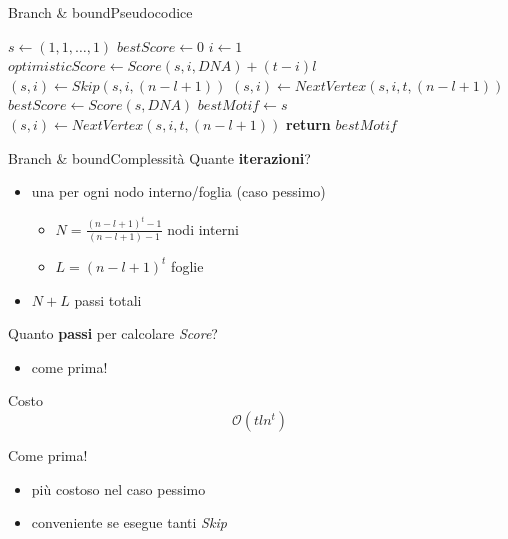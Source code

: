 	\begin{frame}{Branch \& bound}{Pseudocodice}
		\begin{center}\scriptsize
			\begin{minipage}{7.5cm}
			    \begin{algorithmic}[1]
					    \State $s\gets (1,1,\dots,1)$
					    \State $bestScore\gets 0$
					    \State $i\gets 1$
								\State $optimisticScore\gets Score(s,i,DNA)+(t-i)l$
									\State $(s,i)\gets Skip(s,i,(n-l+1))$
								\Else
									\State $(s,i)\gets NextVertex(s,i,t,(n-l+1))$
								\EndIf
							\Else
									\State $bestScore\gets Score(s,DNA)$
									\State $bestMotif\gets s$
								\EndIf
								\State $(s,i)\gets NextVertex(s,i,t,(n-l+1))$
							\EndIf
					    \EndWhile
					    \State \textbf{return} $bestMotif$
				    \EndProcedure
			    \end{algorithmic}
			\end{minipage}
	    \end{center}
	\end{frame}
	
	\begin{frame}{Branch \& bound}{Complessità}
		Quante \alert{\textbf{iterazioni}}?
		\begin{itemize}
			\item una per ogni nodo interno/foglia (caso pessimo)
			\begin{itemize}
				\item $N=\frac{(n-l+1)^t-1}{(n-l+1)-1}$ nodi interni
				\item $L=(n-l+1)^t$ foglie
			\end{itemize}
			\item $N+L$ passi totali
		\end{itemize}
		Quanto \alert{\textbf{passi}} per calcolare \textit{Score}?
		\begin{itemize}
			\item come prima!
		\end{itemize}
		\begin{center}
			\begin{minipage}{3cm}
				\begin{varblock}{Costo}
					$$\mathcal{O}(tln^t)$$
				\end{varblock}
			\end{minipage}
		\end{center}
		Come prima!
		\begin{itemize}
			\item più costoso nel caso pessimo
			\item conveniente se esegue tanti \textit{Skip}
		\end{itemize}
	\end{frame}
	
